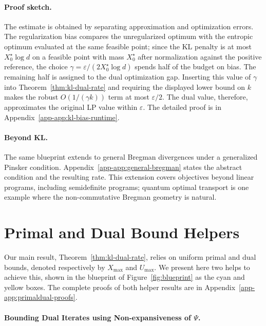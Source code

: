 \documentclass{article}
\theoremstyle{plain}
\renewcommand{\epsilon}{\varepsilon}
\newcommand{\XmaxZero}{X_0^\star}
\begin{document}
\paragraph{Proof sketch.}
The estimate is obtained by separating approximation and optimization errors. The regularization bias compares the unregularized optimum with the entropic optimum evaluated at the same feasible point; since the KL penalty is at most $\XmaxZero\log d$ on a feasible point with mass $\XmaxZero$ after normalization against the positive reference, the choice $\gamma=\epsilon/(2\XmaxZero\log d)$ spends half of the budget on bias. The remaining half is assigned to the dual optimization gap. Inserting this value of $\gamma$ into Theorem~\ref{thm:kl-dual-rate} and requiring the displayed lower bound on $k$ makes the robust $O(1/(\gamma k))$ term at most $\epsilon/2$. The dual value, therefore, approximates the original LP value within $\epsilon$. The detailed proof is in Appendix~\ref{app-app:kl-bias-runtime}.




\paragraph{Beyond KL.}

The same blueprint extends to general Bregman divergences under a generalized Pinsker condition. Appendix~\ref{app-app:general-bregman} states the abstract condition and the resulting rate. This extension covers objectives beyond linear programs, including semidefinite programs; quantum optimal transport is one example where the non-commutative Bregman geometry is natural.


\section{Primal and Dual Bound Helpers}
\label{sec:dual-primal-dual}

Our main result, Theorem~\ref{thm:kl-dual-rate}, relies on uniform primal and dual bounds, denoted respectively by $X_{\max}$ and $U_{\max}$. We present here two helps to achieve this, shown in the blueprint of Figure~\ref{fig:blueprint} as the cyan and yellow boxes. 
%
 The complete proofs of both helper results are in Appendix~\ref{app-app:primaldual-proofs}.

\paragraph{Bounding Dual Iterates using Non-expansiveness of $\Psi$.}
\end{document}
